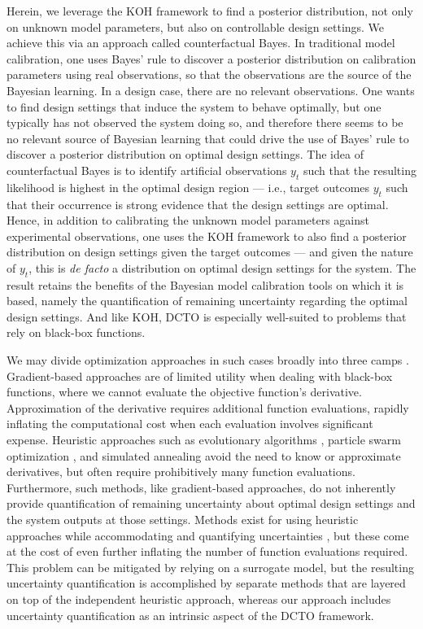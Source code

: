 \documentclass[12pt]{article}
\begin{document}
%
Herein, we leverage the KOH framework to find a posterior distribution, not only on unknown model parameters, but also on controllable design settings.
%
We achieve this via an approach called counterfactual Bayes.
%
In traditional model calibration, one uses Bayes' rule to discover a posterior distribution on calibration parameters using real observations, so that the observations are the source of the Bayesian learning.
%
In a design case, there are no relevant observations.
%
One wants to find design settings that induce the system to behave optimally, but one typically has not observed the system doing so, and therefore there seems to be no relevant source of Bayesian learning that could drive the use of Bayes' rule to discover a posterior distribution on optimal design settings.
%
The idea of counterfactual Bayes is to identify artificial observations $y_t$ such that the resulting likelihood is highest in the optimal design region --- i.e., target outcomes $y_t$ such that their occurrence is strong evidence that the design settings are optimal.
%
Hence, in addition to calibrating the unknown model parameters against experimental observations, one uses the KOH framework to also find a posterior distribution on design settings given the target outcomes --- and given the nature of $y_t$, this is \textit{de facto} a distribution on optimal design settings for the system.
%
The result retains the benefits of the Bayesian model calibration tools on which it is based, namely the quantification of remaining uncertainty regarding the optimal design settings.
%
And like KOH, DCTO is especially well-suited to problems that rely on black-box functions.
%

%
We may divide optimization approaches in such cases broadly into three camps \citep{Regis2004}.
%
Gradient-based approaches \citep{Nocedal2006} are of limited utility when dealing with black-box functions, where we cannot evaluate the objective function's derivative.
%
Approximation of the derivative requires additional function evaluations, rapidly inflating the computational cost when each evaluation involves significant expense.
%
Heuristic approaches \citep{Lee2007} such as evolutionary algorithms \citep{Branke2008,Deb2002,Kim2004}, particle swarm optimization \citep{Bonyadi2017,Mason2017}, and simulated annealing \citep{Robert2004} avoid the need to know or approximate derivatives, but often require prohibitively many function evaluations.
%
Furthermore, such methods, like gradient-based approaches, do not inherently provide quantification of remaining uncertainty about optimal design settings and the system outputs at those settings.
%
Methods exist for using heuristic approaches while accommodating and quantifying uncertainties \citep{Deb2006,Zhou2011b}, but these come at the cost of even further inflating the number of function evaluations required.
%
This problem can be mitigated by relying on a surrogate model, but the resulting uncertainty quantification is accomplished by separate methods that are layered on top of the independent heuristic approach, whereas our approach includes uncertainty quantification as an intrinsic aspect of the DCTO framework.
%
\end{document}
